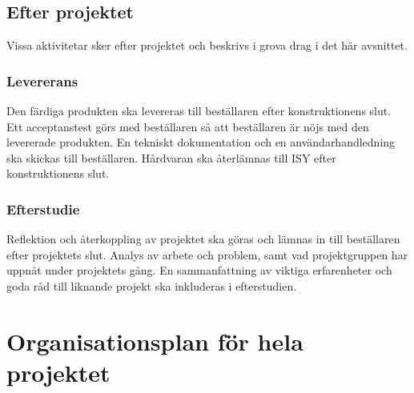 \documentclass[projektplan/plan.tex]{subfiles}
\begin{document}
\subsection{Efter projektet}
Vissa aktivitetar sker efter projektet och beskrivs i grova drag i det här
avsnittet.
\subsubsection*{Levererans}
Den färdiga produkten ska levereras till beställaren efter konstruktionens
slut. Ett acceptanstest görs med beställaren så att beställaren är nöjs med den
levererade produkten. En tekniskt dokumentation och en användarhandledning ska
skickas till beställaren. Hårdvaran ska återlämnas till ISY efter
konstruktionens slut.
\subsubsection*{Efterstudie}
Reflektion och återkoppling av projektet ska göras och lämnas in till
beställaren efter projektets slut. Analys av arbete och problem, samt vad
projektgruppen har uppnåt under projektets gång. En sammanfattning av viktiga
erfarenheter och goda råd till liknande projekt ska inkluderas i efterstudien.

\section{Organisationsplan för hela projektet}


\newpage
\end{document}
